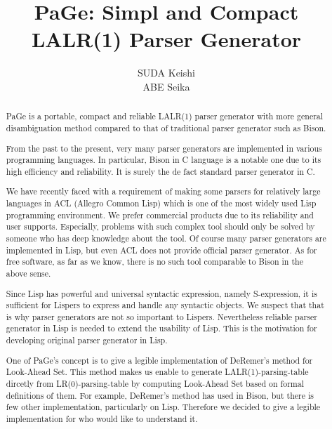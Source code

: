 \documentclass{acm_proc_article-sp}
\begin{document}
\title{PaGe: Simpl and Compact LALR(1) Parser Generator}
\date{}
\author{}

\author{
\alignauthor
SUDA Keishi\\
\alignauthor
ABE Seika\\
}

\maketitle

\begin{abstract}



PaGe is a portable, compact and reliable LALR(1) parser generator
with more general disambiguation method compared to that of traditional parser generator such as Bison.

From the past to the present, very many parser generators are implemented
in various programming languages.  In particular, Bison in C language is
a notable one due to its high efficiency and reliability.
It is surely the de fact standard parser generator in C.

We have recently faced with a requirement of making some parsers for
relatively large languages in ACL (Allegro Common Lisp)
which is one of the most widely used Lisp programming environment.
We prefer commercial products due to its reliability and user supports.
Especially, problems with such complex tool should only be solved by someone
who has deep knowledge about the tool.
Of course many parser generators are implemented in Lisp,
but even ACL does not provide official parser generator.
As for free software, as far as we know, there is no such tool comparable
to Bison in the above sense.

Since Lisp has powerful and universal syntactic expression,
namely S-expression, it is sufficient for Lispers to express and handle
any syntactic objects.  We suspect that that is why parser generators are
not so important to Lispers.
Nevertheless reliable parser generator in Lisp is needed to extend
the usability of Lisp.
This is the motivation for developing original parser generator in Lisp.

One of PaGe's concept is to give a legible implementation of DeRemer's method for Look-Ahead Set.
This method makes us enable to generate LALR(1)-parsing-table dircetly from LR(0)-parsing-table by computing Look-Ahead Set based on formal definitions of them.
For example, DeRemer's method has used in Bison, but there is few other implementation, particularly on Lisp.
Therefore we decided to give a legible implementation for who would like to understand it.


\end{abstract}
\end{document}
